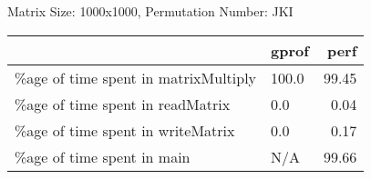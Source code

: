 \documentclass{article}
\begin{document}
    Matrix Size: 1000x1000, Permutation Number: JKI \\
    \begin{tabular}{llr}
\hline
                                      & gprof   &   perf \\
\hline
 \%age of time spent in matrixMultiply & 100.0   &  99.45 \\
 \%age of time spent in readMatrix     & 0.0     &   0.04 \\
 \%age of time spent in writeMatrix    & 0.0     &   0.17 \\
 \%age of time spent in main           & N/A     &  99.66 \\
\hline
\end{tabular}
    
\end{document}
